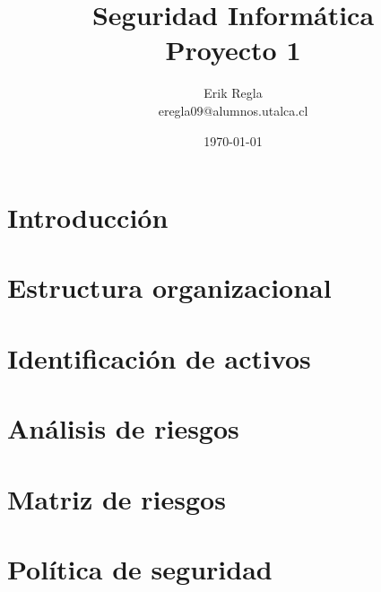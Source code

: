 \documentclass[11pt]{utalcaDoc}
\title{{\bf Seguridad Informática}\\ Proyecto 1}
\author{Erik Regla\\ eregla09@alumnos.utalca.cl}
\date{\today}
\begin{document}
\maketitle

\newpage

\section{Introducción}

\section{Estructura organizacional}


\section{Identificación de activos}



\section{Análisis de riesgos}



\section{Matriz de riesgos}
\section{Política de seguridad}


\begin{thebibliography}{9}







\end{thebibliography}
\end{document}
